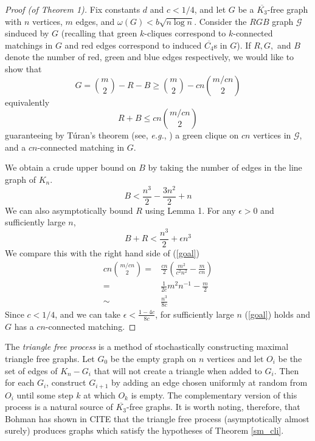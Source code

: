 \documentclass[12pt]{article}
\theoremstyle{definition}
\begin{document}
\begin{proof}[Proof (of Theorem 1)]
Fix constants $d$ and $c < 1/4$, and let $G$ be a $\overline{K_3}$-free graph with $n$ vertices, $m$ edges, and $\omega(G) < b\sqrt{n\log n}$.  Consider the $RGB$ graph $\mathcal{G}$ sinduced by $G$ (recalling that green $k$-cliques correspond to $k$-connected matchings in $G$ and red edges correspond to induced $\overline{C_4}$s in $G$).  If $R, G,$ and $B$ denote the number of red, green and blue edges respectively, we would like to show that \[G = {m\choose 2} - R - B \geq {m\choose 2} - cn{m/cn\choose 2}\] equivalently
\begin{equation}
	R + B \leq cn{m/cn\choose 2}\label{goal}
\end{equation}
guaranteeing by T\'{u}ran's theorem (see, \textit{e.g.}, \cite{dwest}) a green clique on $cn$ vertices in $\mathcal{G}$, and a $cn$-connected matching in $G$.

We obtain a crude upper bound on $B$ by taking the number of edges in the line graph of $K_n$.
\begin{equation}
	B < \frac{n^3}{2} - \frac{3n^2}{2} + n
\end{equation}
We can also asymptotically bound $R$ using Lemma 1.  For any $\epsilon > 0$ and sufficiently large $n$, \[B + R < \frac{n^3}{2} + \epsilon n^3\]
We compare this with the right hand side of (\ref{goal})
\begin{eqnarray}
	cn{m/cn\choose 2} =&\displaystyle \frac{cn}{2}\left(\frac{m^2}{c^2n^2} - \frac{m}{cn}\right)\\
	=& \displaystyle \frac{1}{2c}m^2n^{-1} - \frac{m}{2}\\
	\sim&   \displaystyle \frac{n^3}{8c}
\end{eqnarray}
Since $c < 1/4$, and we can take $\epsilon < \frac{1-4c}{8c}$, for sufficiently large $n$ (\ref{goal}) holds and $G$ has a $cn$-connected matching.
\end{proof}
The \textit{triangle free process} is a method of stochastically constructing maximal triangle free graphs.  Let $G_0$ be the empty graph on $n$ vertices and let $O_i$ be the set of edges of $K_n- G_i$ that will not create a triangle when added to $G_i$.  Then for each $G_i$, construct $G_{i+1}$ by adding an edge chosen uniformly at random from $O_i$ until some step $k$ at which $O_k$ is empty.  The complementary version of this process is a natural source of $\overline{K_3}$-free graphs.  It is worth noting, therefore, that Bohman has shown in CITE that the triangle free process (asymptotically almost surely) produces graphs which satisfy the hypotheses of Theorem \ref{sm_cli}.   
\end{document}
